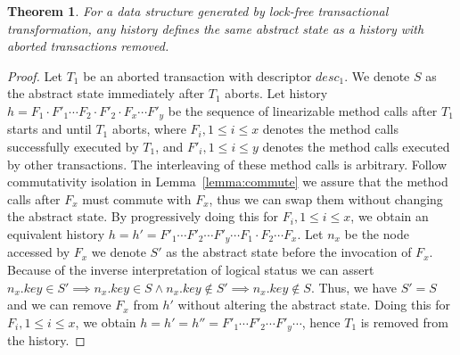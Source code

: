 \documentclass[]{sig-alternate-05-2015}
\newtheorem{theorem}{Theorem}
\begin{document}
\begin{theorem}
    For a data structure generated by lock-free transactional transformation, any history defines the same abstract state as a history with aborted transactions removed.
\end{theorem}
\begin{proof}
    Let $T_1$ be an aborted transaction with descriptor $desc_1$.
    We denote $S$ as the abstract state immediately after $T_1$ aborts.
    Let history $h = F_1 \cdot F'_1 \cdots F_2 \cdot F'_2 \cdot F_x \cdots F'_y$ be the sequence of linearizable method calls after $T_1$ starts and until $T_1$ aborts, where $F_i, 1 \le i \le x$ denotes the method calls successfully executed by $T_1$, and $F'_i, 1 \le i \le y$ denotes the method calls executed by other transactions.
    The interleaving of these method calls is arbitrary.
    Follow commutativity isolation in Lemma~\ref{lemma:commute} we assure that the method calls after $F_x$ must commute with $F_x$, thus we can swap them without changing the abstract state.
    By progressively doing this for $F_i, 1 \le i \le x$, we obtain an equivalent history $h = h' = F'_1 \cdots F'_2 \cdots F'_y \cdots F_1 \cdot F_2 \cdots F_x$.
    Let $n_x$ be the node accessed by $F_x$
    we denote $S'$ as the abstract state before the invocation of $F_x$. 
    Because of the inverse interpretation of logical status we can assert $n_x.key \in S' \implies n_x.key \in S \land n_x.key \notin S' \implies n_x.key \notin S$.
    Thus, we have $S' = S$ and we can remove $F_x$ from $h'$ without altering the abstract state.
    Doing this for $F_i, 1 \le i \le x$, we obtain $h = h' = h'' =F'_1 \cdots F'_2 \cdots F'_y \cdots$, hence $T_1$ is removed from the history.
\end{proof}
\end{document}
